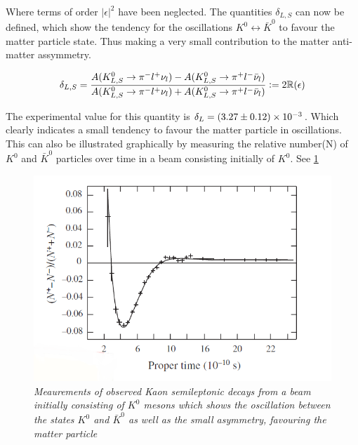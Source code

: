 \noindent Where terms of order $|\epsilon|^{2}$ have been neglected. The quantities $\delta_{L,S}$ can now be defined, which show the tendency for the oscillations $K^{0} \leftrightarrow \bar{K}^{0}$ to favour the matter particle state. Thus making a very small contribution to the matter anti-matter assymmetry.

\begin{equation*}
\delta_{L,S} = \frac{A({K}^{0}_{L,S} \rightarrow \pi^{-} l^{+} \nu_{l}) - A({K}^{0}_{L,S} \rightarrow \pi^{+} l^{-} \bar{\nu}_{l})}{A({K}^{0}_{L,S} \rightarrow \pi^{-} l^{+} \nu_{l}) + A({K}^{0}_{L,S} \rightarrow \pi^{+} l^{-} \bar{\nu}_{l})} \vcentcolon= 2 \mathbb{R}(\epsilon)
\end{equation*}

\noindent The experimental value for this quantity is $\delta_{L} = (3.27 \pm 0.12) \times 10^{-3}$. Which clearly indicates a small tendency to favour the matter particle in oscillations. This can also be illustrated graphically by measuring the relative number(N) of $K^{0}$ and $\bar{K}^{0}$ particles over time in a beam consisting initially of $K^{0}$. See \cref{AsymmetryPicFig}

\begin{figure}[h!]
\begin{center}
\includegraphics[scale=0.4]{figs/Asymmetry_pic}
\end{center}
\caption{\textit{Meaurements of observed Kaon semileptonic decays from a beam initially consisting of $K^{0}$ mesons which shows the oscillation between the states $K^{0}$ and $\bar{K}^{0}$ as well as the small asymmetry, favouring the matter particle \cite{AsymmetryPic}}}
\label{AsymmetryPicFig}
\end{figure}


